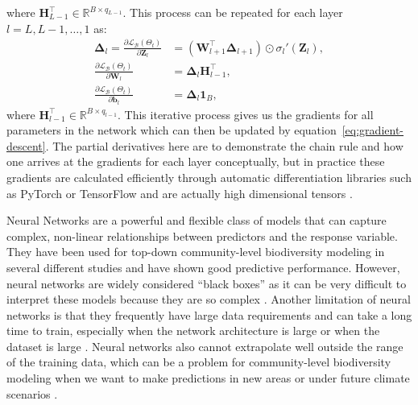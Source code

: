 where \(\mathbf{H}_{L-1}^\top \in \mathbb{R}^{B \times q_{L-1}}\). This process can be repeated for each layer \(l = L, L-1, \ldots, 1\) as:
\[
\begin{aligned}
\boldsymbol{\Delta}_l = \frac{\partial \mathcal{L}_\mathcal{B}(\Theta_t)}{\partial \mathbf{Z}_l} &= (\mathbf{W}_{l+1}^\top\boldsymbol{\Delta}_{l+1}) \odot \sigma_l'(\mathbf{Z}_l),\\
\frac{\partial \mathcal{L}_\mathcal{B}(\Theta_t)}{\partial \mathbf{W}_{l}} &= \boldsymbol{\Delta}_l\mathbf{H}_{l-1}^\top,\\
\frac{\partial \mathcal{L}_\mathcal{B}(\Theta_t)}{\partial \mathbf{b}_{l}} &= \boldsymbol{\Delta}_l\mathbf{1}_B,
\end{aligned}
\]
where \(\mathbf{H}_{l-1}^\top \in \mathbb{R}^{B \times q_{l-1}}\). This iterative process gives us the gradients for all parameters in the network which can then be updated by equation~\ref{eq:gradient-descent}. The partial derivatives here are to demonstrate the chain rule and how one arrives at the gradients for each layer conceptually, but in practice these gradients are calculated efficiently through automatic differentiation libraries such as PyTorch or TensorFlow and are actually high dimensional tensors \parencite{prince2023understanding, pytorchdocs2026}.

Neural Networks are a powerful and flexible class of models that can capture complex, non-linear relationships between predictors and the response variable. They have been used for top-down community-level biodiversity modeling in several different studies \parencite{mondal2021, andermann2022, brugere2023, cai2023, hu2025} and have shown good predictive performance. However, neural networks are widely considered ``black boxes'' as it can be very difficult to interpret these models because they are so complex \parencite{pichler2023, hu2025}. Another limitation of neural networks is that they frequently have large data requirements and can take a long time to train, especially when the network architecture is large or when the dataset is large \parencite{pichler2023}. Neural networks also cannot extrapolate well outside the range of the training data, which can be a problem for community-level biodiversity modeling when we want to make predictions in new areas or under future climate scenarios \parencite{beery2021, pichler2023}.

